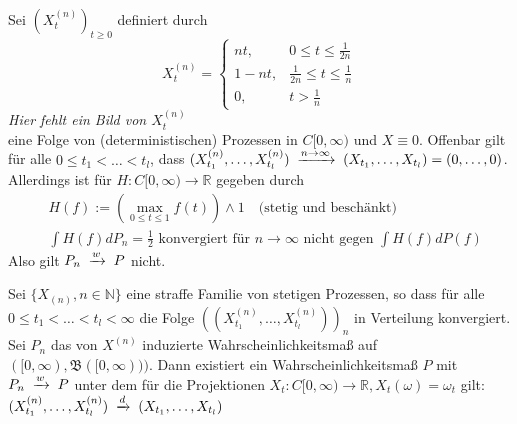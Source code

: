 \documentclass[a4paper,twoside,DIV15,BCOR12mm]{scrbook}
\newcommand{\borel}{{\mathfrak B}}
\begin{document}
\begin{beispiel}
  Sei $(X_t^{(n)})_{t\geq0}$ definiert durch
\[
X_t^{(n)}=
\begin{cases}
nt, & 0\leq t\leq \frac{1}{2n} \\
1-nt, & \frac{1}{2n}\leq t\leq\frac{1}{n} \\
0, & t>\frac{1}{n}
\end{cases}
\]
\emph{Hier fehlt ein Bild von $X_t^{(n)}$} \\
eine Folge von (deterministischen) Prozessen in $C[0,\infty)$ und $X\equiv 0$. Offenbar gilt für alle $0\leq t_1<\dots<t_l$, dass $(X_{t_1}^{(n)},\dots,X_{t_l}^{(n)})\tomit{n\to\infty}(X_{t_1},\dots,X_{t_l})=(0,\dots,0)$. \\
Allerdings ist für $H:C[0,\infty)\longrightarrow\mathbb R$ gegeben durch 
  \begin{align*}
  & H(f):=\left(\max_{0\leq t\leq1}f(t)\right)\wedge1\quad \text{(stetig und beschänkt)} \\
 & \int H(f)dP_n=\frac{1}{2}\text{ konvergiert für $n\to\infty$ nicht gegen } \int H(f)dP(f)
  \end{align*}
Also gilt $P_n\tomit{w}P$ nicht.
\end{beispiel}
\begin{satz}
  \label{satz:14.3}
Sei $\{X_{(n)},n\in\mathbb N\}$ eine straffe Familie von stetigen Prozessen, so dass für alle $0\leq t_1<\dots<t_l<\infty$ die Folge $((X_{t_1}^{(n)},\dots,X_{t_l}^{(n)}))_n$ in Verteilung konvergiert. Sei $P_n$ das von $X^{(n)}$ induzierte Wahrscheinlichkeitsmaß auf $([0,\infty),\borel([0,\infty)))$. Dann existiert ein Wahrscheinlichkeitsmaß $P$ mit $P_n\tomit{w}P$ unter dem für die Projektionen $X_t:C[0,\infty)\longrightarrow\mathbb R,X_t(\omega)=\omega_t$ gilt: $(X_{t_1}^{(n)},\dots,X_{t_l}^{(n)})\tomit{d}(X_{t_1},\dots,X_{t_l})$
\end{satz}
\end{document}
